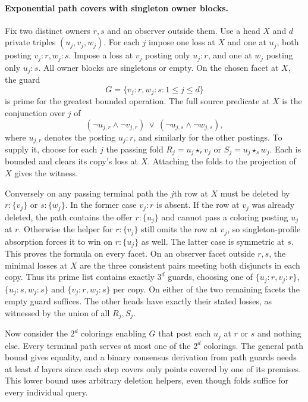 \paragraph{Exponential path covers with singleton owner blocks.}
Fix two distinct owners $r,s$ and an observer outside them.
Use a head $X$ and $d$ private triples $(u_j,v_j,w_j)$.
For each $j$ impose one loss at $X$ and one at $u_j$, both
posting $v_j:r,w_j:s$. Impose a loss at $v_j$ posting only
$u_j:r$, and one at $w_j$ posting only $u_j:s$.
All owner blocks are singletons or empty. On the chosen facet
at $X$, the guard
\[
 G=\{v_j:r,w_j:s:1\le j\le d\}
\]
is prime for the greatest bounded operation. The full source
predicate at $X$ is the conjunction over $j$ of
\[
 (\neg u_{j,r}\wedge\neg v_{j,r})
 \ \vee\ (\neg u_{j,s}\wedge\neg w_{j,s}),
\]
where $u_{j,r}$ denotes the posting $u_j:r$, and similarly
for the other postings. To supply it, choose for each $j$
the passing fold $R_j=u_j\star_r v_j$ or $S_j=u_j\star_s w_j$.
Each is bounded and clears its copy's loss at $X$.
Attaching the folds to the projection of $X$ gives the witness.

Conversely on any passing terminal path the $j$th row at $X$
must be deleted by $r:\{v_j\}$ or $s:\{w_j\}$. In the
former case $v_j:r$ is absent. If the row at $v_j$
was already deleted, the path contains the offer $r:\{u_j\}$
and cannot pass a coloring posting $u_j$ at $r$. Otherwise
the helper for $r:\{v_j\}$ still omits the row at $v_j$,
so singleton-profile absorption forces it to win on
$r:\{u_j\}$ as well. The latter case is symmetric at $s$.
This proves the formula on every facet. On an observer facet
outside $r,s$, the minimal losses at $X$ are the three
consistent pairs meeting both disjuncts in each copy. Thus
its prime list contains exactly $3^d$ guards, choosing one of
$\{u_j:r,v_j:r\}$, $\{u_j:s,w_j:s\}$ and
$\{v_j:r,w_j:s\}$ per copy. On either of the two remaining
facets the empty guard suffices. The other heads have exactly
their stated losses, as witnessed by the union of all $R_j,S_j$.

Now consider the $2^d$ colorings enabling $G$ that post each
$u_j$ at $r$ or $s$ and nothing else. Every terminal path
serves at most one of the
$2^d$ colorings. The general path bound gives equality,
and a binary consensus derivation from path guards needs
at least $d$ layers since each step covers only points
covered by one of its premises. This lower bound uses
arbitrary deletion helpers, even though folds suffice for
every individual query.


